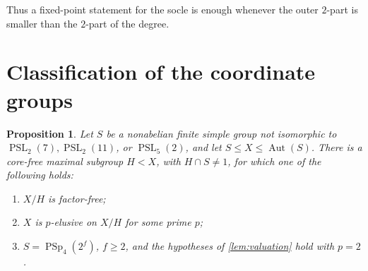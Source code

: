 \documentclass[11pt]{amsart}
\newcommand{\Aut}{\operatorname{Aut}}
\newcommand{\PSL}{\operatorname{PSL}}
\newcommand{\PSp}{\operatorname{PSp}}
\newtheorem{proposition}[theorem]{Proposition}
\theoremstyle{definition}
\begin{document}
Thus a fixed-point statement for the socle is enough whenever the outer
\(2\)-part is smaller than the \(2\)-part of the degree.

\section{Classification of the coordinate groups}\label{sec:classification}

\begin{proposition}\label{prop:classification}
Let \(S\) be a nonabelian finite simple group not isomorphic to
\(\PSL_2(7),\PSL_2(11)\), or \(\PSL_5(2)\), and let
\(S\leq X\leq\Aut(S)\).  There is a core-free maximal subgroup \(H<X\),
with \(H\cap S\ne1\), for which one of the following holds:
\begin{enumerate}
\item \(X/H\) is factor-free;
\item \(X\) is \(p\)-elusive on \(X/H\) for some prime \(p\);
\item \(S=\PSp_4(2^f)\), \(f\ge2\), and the hypotheses of
\cref{lem:valuation} hold with \(p=2\).
\end{enumerate}
\end{proposition}
\end{document}
